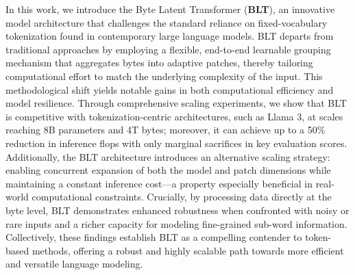 In this work, we introduce the Byte Latent Transformer (\textbf{BLT}), an innovative model architecture that challenges the standard reliance on fixed-vocabulary tokenization found in contemporary large language models. {\textsc BLT} departs from traditional approaches by employing a flexible, end-to-end learnable grouping mechanism that aggregates bytes into adaptive patches, thereby tailoring computational effort to match the underlying complexity of the input. This methodological shift yields notable gains in both computational efficiency and model resilience. Through comprehensive scaling experiments, we show that {\textsc BLT} is competitive with tokenization-centric architectures, such as Llama 3, at scales reaching 8B parameters and 4T bytes; moreover, it can achieve up to a 50\% reduction in inference flops with only marginal sacrifices in key evaluation scores. Additionally, the {\textsc BLT} architecture introduces an alternative scaling strategy: enabling concurrent expansion of both the model and patch dimensions while maintaining a constant inference cost—a property especially beneficial in real-world computational constraints. Crucially, by processing data directly at the byte level, {\textsc BLT} demonstrates enhanced robustness when confronted with noisy or rare inputs and a richer capacity for modeling fine-grained sub-word information. Collectively, these findings establish {\textsc BLT} as a compelling contender to token-based methods, offering a robust and highly scalable path towards more efficient and versatile language modeling.

